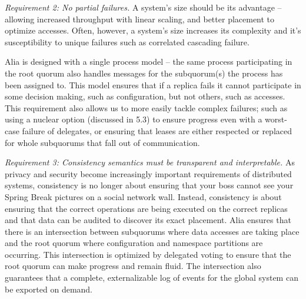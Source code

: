 \documentclass[11pt,conference]{IEEEtran}
\begin{document}
\emph{Requirement 2: No partial failures.}
A system's size should be its advantage -- allowing increased throughput with linear
scaling, and better placement to optimize accesses.
Often, however, a system's size increases its complexity and it's susceptibility
to unique failures such as correlated cascading failure.

Alia is designed with a single process model -- the same process participating in
the root quorum also handles messages for the subquorum(s) the process has been
assigned to.
This model ensures that if a replica fails it cannot participate in some decision
making, such as configuration, but not others, such as accesses.
This requirement also allows us to more easily tackle complex failures; such as
using a nuclear option (discussed in 5.3) to ensure progress even with a worst-case
failure of delegates, or ensuring that leases are either respected or replaced
for whole subquorums that fall out of communication.

\emph{Requirement 3: Consistency semantics must be transparent and interpretable.}
As privacy and security become increasingly important requirements of distributed
systems, consistency is no longer about ensuring that your boss cannot see your
Spring Break pictures on a social network wall.
Instead, consistency is about ensuring that the correct operations are being
executed on the correct replicas and that data can be audited to discover its
exact placement.
Alia ensures that there is an intersection between subquorums where data accesses
are taking place and the root quorum where configuration and namespace partitions
are occurring.
This intersection is optimized by delegated voting to ensure that the root
quorum can make progress and remain fluid.
The intersection also guarantees that a complete, externalizable log of events
for the global system can be exported on demand.



\end{document}
